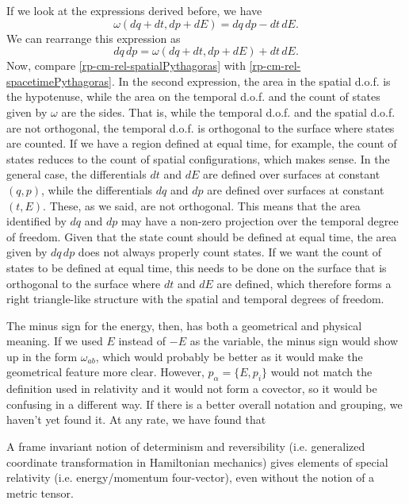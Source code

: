 If we look at the expressions derived before, we have
\begin{equation}
	\omega(dq + dt, dp + dE) = dq \, dp - dt \, dE.
\end{equation}
We can rearrange this expression as
\begin{equation}\label{rp-cm-rel-spacetimePythagoras}
	dq \, dp = \omega(dq + dt, dp + dE) + dt \, dE.
\end{equation}
Now, compare \ref{rp-cm-rel-spatialPythagoras} with \ref{rp-cm-rel-spacetimePythagoras}. In the second expression, the area in the spatial d.o.f. is the hypotenuse, while the area on the temporal d.o.f. and the count of states given by $\omega$ are the sides. That is, while the temporal d.o.f. and the spatial d.o.f. are not orthogonal, the temporal d.o.f. is orthogonal to the surface where states are counted. If we have a region defined at equal time, for example, the count of states reduces to the count of spatial configurations, which makes sense. In the general case, the differentials $dt$ and $dE$ are defined over surfaces at constant $(q, p)$, while the differentials $dq$ and $dp$ are defined over surfaces at constant $(t,E)$. These, as we said, are not orthogonal. This means that the area identified by $dq$ and $dp$ may have a non-zero projection over the temporal degree of freedom. Given that the state count should be defined at equal time, the area given by $dq \, dp$ does not always properly count states. If we want the count of states to be defined at equal time, this needs to be done on the surface that is orthogonal to the surface where $dt$ and $dE$ are defined, which therefore forms a right triangle-like structure with the spatial and temporal degrees of freedom.

The minus sign for the energy, then, has both a geometrical and physical meaning. If we used $E$ instead of $-E$ as the variable, the minus sign would show up in the form $\omega_{ab}$, which would probably be better as it would make the geometrical feature more clear. However, $p_\alpha = \{ E, p_i\}$ would not match the definition used in relativity and it would not form a covector, so it would be confusing in a different way. If there is a better overall notation and grouping, we haven't yet found it. At any rate, we have found that
\begin{insight}
	A frame invariant notion of determinism and reversibility (i.e. generalized coordinate transformation in Hamiltonian mechanics) gives elements of special relativity (i.e. energy/momentum four-vector), even without the notion of a metric tensor.
\end{insight}


